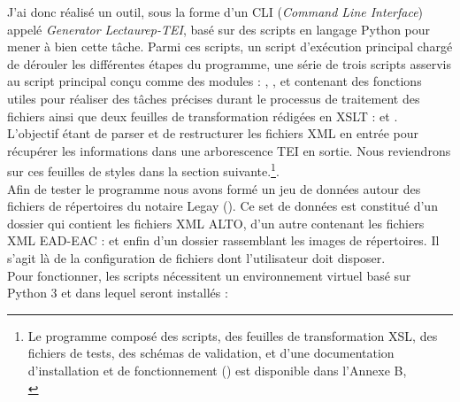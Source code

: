J'ai donc réalisé un outil, sous la forme d'un CLI (\textit{Command Line Interface}) appelé \textit{Generator Lectaurep-TEI}, basé sur des scripts en langage Python pour mener à bien cette tâche. Parmi ces scripts, un script d'exécution principal  chargé de dérouler les différentes étapes du programme, une série de trois scripts asservis au script principal conçu comme des modules : , , et  contenant des fonctions utiles pour réaliser des tâches précises durant le processus de traitement des fichiers ainsi que deux feuilles de transformation rédigées en XSLT :  et .\\ L'objectif étant de parser et de restructurer les fichiers XML en entrée pour récupérer les informations dans une arborescence TEI en sortie. Nous reviendrons sur ces feuilles de styles dans la section suivante.\footnote{Le programme composé des scripts, des feuilles de transformation XSL, des fichiers de tests, des schémas de validation, et d'une documentation d'installation et de fonctionnement  () est disponible dans l'Annexe B, \\
}.\\

Afin de tester le programme nous avons formé un jeu de données autour des fichiers de répertoires du notaire Legay (). Ce set de données est constitué d'un dossier  qui contient les fichiers XML ALTO, d'un autre contenant les fichiers XML EAD-EAC :   et enfin d'un dossier  rassemblant les images de répertoires. Il s'agit là de la configuration de fichiers dont l'utilisateur doit disposer.\\
\newpage
Pour fonctionner, les scripts nécessitent un environnement virtuel basé sur Python 3 et dans lequel seront installés :

